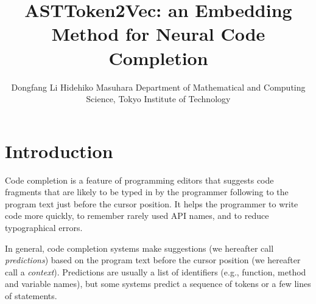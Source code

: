 \documentclass[E]{compsoft}
\begin{document}
\title{ASTToken2Vec: an Embedding Method for Neural Code Completion}

\author{Dongfang Li  \quad   Hidehiko Masuhara
%
%
%
%
%
{Department of Mathematical and Computing Science, Tokyo Institute of Technology}}




\maketitle \thispagestyle {empty}







\section{Introduction}\label{sec:introduction}
Code completion is a feature of programming editors that suggests code fragments that are likely to be typed in by the programmer following to the program text just before the cursor position.  It helps the programmer to write code more quickly, to remember rarely used API names, and to reduce typographical errors.

In general, code completion systems make suggestions (we hereafter call \emph{predictions}) based on the program text before the cursor position (we hereafter call a \emph{context}).  Predictions are usually a list of identifiers (e.g., function, method and variable names), but some systems predict a sequence of tokens or a few lines of statements.
\end{document}
